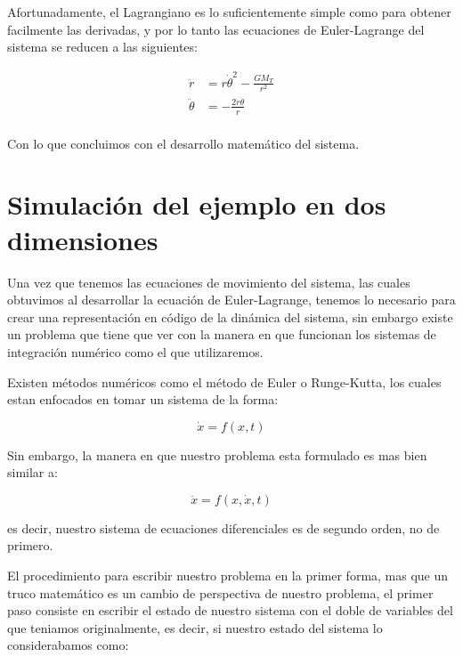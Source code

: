 \documentclass{article}
\begin{document}
    Afortunadamente, el Lagrangiano es lo suficientemente simple como para
obtener facilmente las derivadas, y por lo tanto las ecuaciones de
Euler-Lagrange del sistema se reducen a las siguientes:

    \begin{align}
\ddot{r} &= r \dot{\theta}^2 - \frac{GM_T}{r^2} \\
\ddot{\theta} &= - \frac{2 \dot{r} \dot{\theta}}{r} \\
\end{align}

    Con lo que concluimos con el desarrollo matemático del sistema.

    \hypertarget{simulaciuxf3n-del-ejemplo-en-dos-dimensiones}{%
\section{Simulación del ejemplo en dos
dimensiones}\label{simulaciuxf3n-del-ejemplo-en-dos-dimensiones}}

    Una vez que tenemos las ecuaciones de movimiento del sistema, las cuales
obtuvimos al desarrollar la ecuación de Euler-Lagrange, tenemos lo
necesario para crear una representación en código de la dinámica del
sistema, sin embargo existe un problema que tiene que ver con la manera
en que funcionan los sistemas de integración numérico como el que
utilizaremos.

Existen métodos numéricos como el método de Euler o Runge-Kutta, los
cuales estan enfocados en tomar un sistema de la forma:

    \begin{equation}
\dot{x} = f(x, t)
\end{equation}

    Sin embargo, la manera en que nuestro problema esta formulado es mas
bien similar a:

    \begin{equation}
\ddot{x} = f(x, \dot{x}, t)
\end{equation}

    es decir, nuestro sistema de ecuaciones diferenciales es de segundo
orden, no de primero.

El procedimiento para escribir nuestro problema en la primer forma, mas
que un truco matemático es un cambio de perspectiva de nuestro problema,
el primer paso consiste en escribir el estado de nuestro sistema con el
doble de variables del que teniamos originalmente, es decir, si nuestro
estado del sistema lo considerabamos como:
\end{document}
